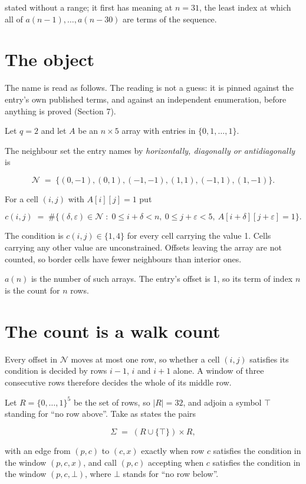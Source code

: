\documentclass[11pt]{article}
\theoremstyle{definition}
\begin{document}
stated without a range; it first has meaning at $n = 31$, the least index at which all of $a(n-1),\dots,a(n-30)$ are terms of the sequence.

\section{The object}

The name is read as follows. The reading is not a guess: it is pinned against the entry's own published terms, and against an independent enumeration, before anything is proved (Section 7).

Let $q = 2$ and let $A$ be an $n \times 5$ array with entries in $\{0,1,\dots,1\}$.

The neighbour set the entry names by {\itshape horizontally, diagonally or antidiagonally} is

\[\mathcal{N} \;=\; \{(0,-1), (0,1), (-1,-1), (1,1), (-1,1), (1,-1)\}.\]

For a cell $(i,j)$ with $A[i][j] = 1$ put

\[c(i,j) \;=\; \#\bigl\{(\delta,\varepsilon)\in\mathcal{N} \;:\; 0\le i+\delta<n,\ 0\le j+\varepsilon<5,\ A[i+\delta][j+\varepsilon] = 1\bigr\}.\]

The condition is $c(i,j) \in \{1, 4\}$ for every cell carrying the value 1. Cells carrying any other value are unconstrained. Offsets leaving the array are not counted, so border cells have fewer neighbours than interior ones.

$a(n)$ is the number of such arrays. The entry's offset is 1, so its term of index $n$ is the count for $n$ rows.

\section{The count is a walk count}

Every offset in $\mathcal{N}$ moves at most one row, so whether a cell $(i,j)$ satisfies its condition is decided by rows $i-1$, $i$ and $i+1$ alone. A window of three consecutive rows therefore decides the whole of its middle row.

Let $R = \{0,\dots,1\}^{5}$ be the set of rows, so $|R| = 32$, and adjoin a symbol $\top$ standing for ``no row above''. Take as states the pairs

\[\Sigma \;=\; (R \cup \{\top\}) \times R,\]

with an edge from $(p,c)$ to $(c,x)$ exactly when row $c$ satisfies the condition in the window $(p,c,x)$, and call $(p,c)$ accepting when $c$ satisfies the condition in the window $(p,c,\bot)$, where $\bot$ stands for ``no row below''.
\end{document}
